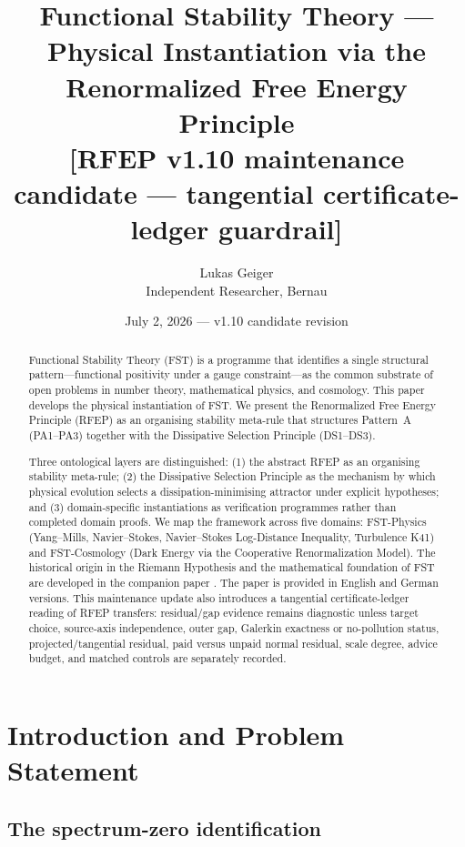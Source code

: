 \documentclass[11pt,a4paper]{article}
\title{Functional Stability Theory --- Physical Instantiation via the\\
Renormalized Free Energy Principle\\
\vspace{0.3em}
{\large [RFEP v1.10 maintenance candidate --- tangential certificate-ledger guardrail]}}
\author{Lukas Geiger\\
\small Independent Researcher, Bernau}
\date{July 2, 2026 --- v1.10 candidate revision}
\theoremstyle{plain}
\theoremstyle{definition}
\begin{document}
\maketitle

\begin{abstract}
Functional Stability Theory (FST) is a programme that identifies a
single structural pattern---functional positivity under a gauge
constraint---as the common substrate of open problems in number
theory, mathematical physics, and cosmology. This paper develops the
physical instantiation of FST. We present the Renormalized Free
Energy Principle (RFEP) as an organising stability meta-rule that
structures Pattern~A (PA1--PA3) together with the Dissipative
Selection Principle (DS1--DS3).

Three ontological layers are distinguished: (1) the abstract RFEP as
an organising stability meta-rule; (2) the Dissipative Selection
Principle as the mechanism by which physical evolution selects a
dissipation-minimising attractor under explicit hypotheses; and
(3) domain-specific instantiations as verification programmes rather
than completed domain proofs. We map the framework across five
domains: FST-Physics (Yang--Mills, Navier--Stokes, Navier--Stokes
Log-Distance Inequality, Turbulence K41) and FST-Cosmology (Dark
Energy via the Cooperative Renormalization Model). The historical
origin in the Riemann Hypothesis and the
mathematical foundation of FST are developed in the companion paper
\cite{ZetaZooMaster}. The paper is provided in English and German
versions.
This maintenance update also introduces a tangential certificate-ledger
reading of RFEP transfers: residual/gap evidence remains diagnostic
unless target choice, source-axis independence, outer gap, Galerkin
exactness or no-pollution status, projected/tangential residual,
paid versus unpaid normal residual, scale degree, advice budget, and
matched controls are separately recorded.
\end{abstract}

\tableofcontents

\section{Introduction and Problem Statement}
\label{sec:intro}

\subsection{The spectrum-zero identification}
\end{document}
